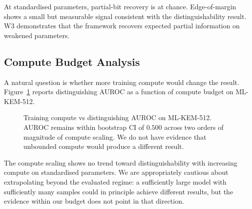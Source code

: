 \documentclass[sigconf,nonacm]{acmart}
\begin{document}
At standardised parameters, partial-bit recovery is at chance.
Edge-of-margin shows a small but measurable signal consistent with
the distinguishability result. W3 demonstrates that the framework
recovers expected partial information on weakened parameters.

\subsection{Compute Budget Analysis}

A natural question is whether more training compute would change
the result. Figure~\ref{fig:compute} reports distinguishing AUROC
as a function of compute budget on ML-KEM-512.

\begin{figure}[h]
\centering
{}
\caption{Training compute vs distinguishing AUROC on ML-KEM-512.
  AUROC remains within bootstrap CI of $0.500$ across two orders of
  magnitude of compute scaling. We do not have evidence that
  unbounded compute would produce a different result.}
\label{fig:compute}
\end{figure}

The compute scaling shows no trend toward distinguishability with
increasing compute on standardised parameters. We are appropriately
cautious about extrapolating beyond the evaluated regime: a
sufficiently large model with sufficiently many samples could in
principle achieve different results, but the evidence within our
budget does not point in that direction.
\end{document}
